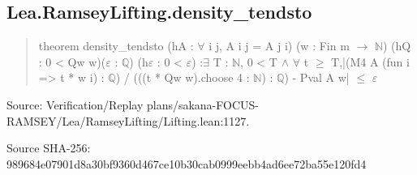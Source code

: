 \documentclass[11pt,a4paper]{article}
\begin{document}
\begin{samepage}
\subsection{Lea.RamseyLifting.density\_tendsto}
\begin{quote}\small\ttfamily theorem density\_tendsto (hA : \ensuremath{\forall} i j, A i j = A j i) (w : Fin m \ensuremath{\to} \ensuremath{\mathbb{N}}) (hQ : 0 < Qw w)\newline     (\ensuremath{\varepsilon} : \ensuremath{\mathbb{Q}}) (h\ensuremath{\varepsilon} : 0 < \ensuremath{\varepsilon}) :\newline     \ensuremath{\exists} T : \ensuremath{\mathbb{N}}, 0 < T \ensuremath{\wedge} \ensuremath{\forall} t \ensuremath{\geq} T,\newline       |(M4 A (fun i => t * w i) : \ensuremath{\mathbb{Q}}) / (((t * Qw w).choose 4 : \ensuremath{\mathbb{N}}) : \ensuremath{\mathbb{Q}}) - Pval A w| \ensuremath{\leq} \ensuremath{\varepsilon}\end{quote}
{\small Source: Verification/Replay plans/sakana-FOCUS-RAMSEY/Lea/RamseyLifting/Lifting.lean:1127.\par}

{\small Source SHA-256: 989684e07901d8a30bf9360d467ce10b30cab0999eebb4ad6ee72ba55e120fd4\par}

\end{samepage}
\end{document}
